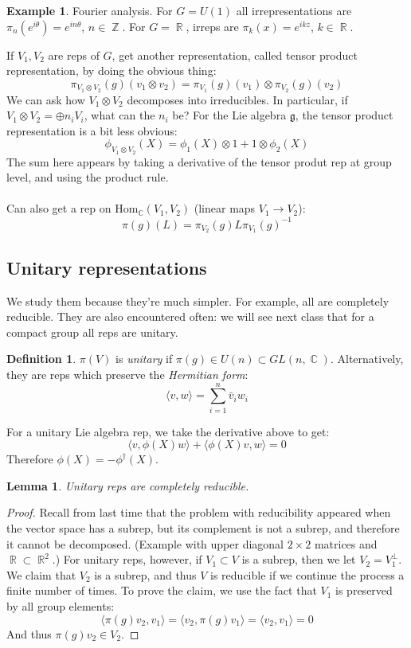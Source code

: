 \documentclass[12 pt]{article}
\DeclareMathOperator {\R} {\mathbb{R}}
\DeclareMathOperator {\C} {\mathbb{C}}
\DeclareMathOperator {\Z} {\mathbb{Z}}
\theoremstyle{plain}
\newtheorem{lem}[thm]{Lemma}
\theoremstyle{definition}
\newtheorem{defn}{Definition}
\newtheorem{exmp}{Example}
\theoremstyle{remark}
\begin{document}
\begin{exmp}
Fourier analysis. For $G = U(1)$ all irrepresentations are $\pi_n (e^{i\theta}) = e^{in\theta}$, $n\in \Z$. For $G = \R$, irreps are $\pi_k (x) = e^{ikz}$, $k\in \R$.
\end{exmp}

If $V_1, V_2$ are reps of $G$, get another representation, called tensor product representation, by doing the obvious thing:
\[     \pi_{V_1\otimes V_2} (g) (v_1 \otimes v_2) = \pi_{V_1} (g) (v_1) \otimes \pi_{V_2} (g) (v_2)   \]
We can ask how $V_1 \otimes V_2$ decomposes into irreducibles. In particular, if $V_1 \otimes V_2 = \oplus n_i V_i$, what can the $n_i$ be? For the Lie algebra $\mathfrak g$, the tensor product representation is a bit less obvious:
\[    \phi_{V_1\otimes V_2} (X) = \phi_1(X) \otimes 1 + 1 \otimes \phi_2(X)     \]
The sum here appears by taking a derivative of the tensor produt rep at group level, and using the product rule.
\\
\\
Can also get a rep on Hom$_{\C} (V_1, V_2)$ (linear maps $V_1 \to V_2$):
\[     \pi (g) (L) = \pi_{V_2}(g) L \pi_{V_1}(g)^{-1}    \]

\subsection*{Unitary representations}
We study them because they're much simpler. For example, all are completely reducible. They are also encountered often: we will see next class that for a compact group all reps are unitary.

\begin{defn}
$\pi (V)$ is \emph{unitary} if $\pi(g) \in U(n) \subset GL(n, \C)$. Alternatively, they are reps which preserve the \emph{Hermitian form}:
\[     \langle v, w \rangle = \sum_{i=1}^n \bar v_i w_i    \]
\end{defn}
For a unitary Lie algebra rep, we take the derivative above to get:
\[     \langle v, \phi(X) w \rangle + \langle \phi(X) v, w \rangle = 0     \]
Therefore $\phi(X) = - \phi^{\dagger}(X)$.

\begin{lem}
Unitary reps are completely reducible.
\end{lem}
\begin{proof}
Recall from last time that the problem with reducibility appeared when the vector space has a subrep, but its complement is not a subrep, and therefore it cannot be decomposed. (Example with upper diagonal $2\times 2$ matrices and $\R \subset \R^2$.) For unitary reps, however, if $V_1 \subset V$ is a subrep, then we let $V_2 = V_1^{\perp}$. We claim that $V_2$ is a subrep, and thus $V$ is reducible if we continue the process a finite number of times. To prove the claim, we use the fact that $V_1$ is preserved by all group elements:
\[      \langle \pi(g) v_2 , v_1 \rangle = \langle v_2, \pi(g) v_1 \rangle = \langle v_2, v_1\rangle = 0     \]
And thus $\pi(g) v_2 \in V_2$.
\end{proof}
\end{document}
